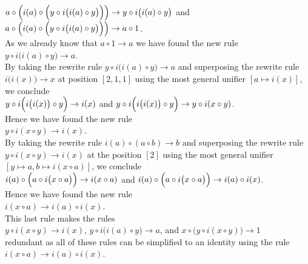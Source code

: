 $a \circ \Bigl(i(a) \circ \Bigl(y \circ i\bigl(i(a)\circ y\bigr)\Bigr)\Bigr) \rightarrow y \circ i\bigl(i(a)\circ y\bigr)$
\quad and \quad
$a \circ \Bigl(i(a) \circ \Bigl(y \circ i\bigl(i(a)\circ y\bigr)\Bigr)\Bigr) \rightarrow a \circ 1$.
\\[0.2cm]
As we already know that $a \circ 1 \rightarrow a$ we have found the new rule
\\[0.2cm]
\hspace*{1.3cm}
$y \circ i\bigl(i(a)\circ y\bigr) \rightarrow a$.
\\[0.2cm]
By taking the rewrite rule $y \circ i\bigl(i(a)\circ y\bigr) \rightarrow a$ and superposing the rewrite rule $i\bigl(i(x)\bigr)
\rightarrow x$ at
position $[2, 1, 1]$ using the most general unifier $[a \mapsto i(x)]$, 
we conclude
\\[0.2cm]
\hspace*{1.3cm}
$y \circ i\Bigl(i\bigl(i(x)\bigr)\circ y\Bigr) \rightarrow i(x)$ \quad and \quad
$y \circ i\Bigl(i\bigl(i(x)\bigr)\circ y\Bigr) \rightarrow y \circ i(x \circ y)$.
\\[0.2cm]
Hence we have found the new rule
\\[0.2cm]
\hspace*{1.3cm}
$y \circ i(x \circ y) \rightarrow i(x)$.
\\[0.2cm]
By taking the rewrite rule  $i(a) \circ (a \circ b) \rightarrow b$ and superposing the rewrite rule $y \circ i(x \circ y) \rightarrow i(x)$
at the position $[2]$ using the most general unifier $[y \mapsto a, b \mapsto i(x \circ a)]$, we conclude
\\[0.2cm]
\hspace*{1.3cm}
$i(a) \circ \Bigl(a \circ i\bigl(x \circ a\bigr)\Bigr) \rightarrow i(x \circ a)$ \quad and \quad
$i(a) \circ \Bigl(a \circ i\bigl(x \circ a\bigr)\Bigr) \rightarrow i(a) \circ i(x)$.
\\[0.2cm]
Hence we have found the new rule
\\[0.2cm]
\hspace*{1.3cm}
$i(x \circ a) \rightarrow i(a) \circ i(x)$.
\\[0.2cm]
This last rule makes the rules
\\[0.2cm]
\hspace*{1.3cm}
$y \circ i(x \circ y) \rightarrow i(x)$, \quad
$y \circ i\bigl(i(a)\circ y\bigr) \rightarrow a$, \quad and \quad
$x \circ \bigl(y \circ i(x \circ y)\bigr) \rightarrow 1$
\\[0.2cm]
redundant as all of these rules can be simplified to an identity using the rule $i(x \circ a) \rightarrow i(a) \circ i(x)$.
